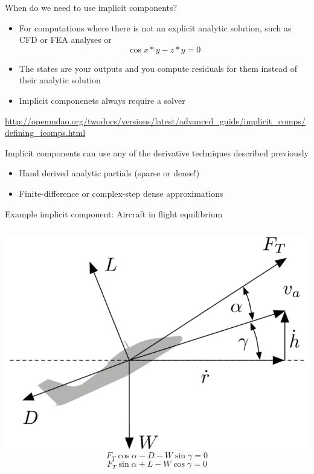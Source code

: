 \documentclass[aspectratio=169, usenames,dvipsnames, 14pt]{beamer}
\begin{document}
\begin{frame}{When do we need to use implicit components?}   

	\begin{itemize}
		\item For computations where there is not an explicit analytic solution, such as CFD or FEA analyses or $$ \cos{x*y} - z*y = 0 $$
		\item The states are your outputs and you compute residuals for them instead of their analytic solution
		\item Implicit componenets always require a solver
	\end{itemize}
	\url{http://openmdao.org/twodocs/versions/latest/advanced_guide/implicit_comps/defining_icomps.html}
	
\end{frame}  

\begin{frame}{Implicit components can use any of the derivative techniques described previously}

	\begin{itemize}
		\item Hand derived analytic partials (sparse or dense!)
		\item Finite-difference or complex-step dense approximations
	\end{itemize}

\end{frame}     

\begin{frame}{Example implicit component: Aircraft in flight equilibrium}

	\begin{columns}
			\includegraphics[scale=.46]{images/slide_49_derivatives.png}
				$$ F_T \cos{\alpha} - D - W \sin{\gamma} = 0 $$
				$$ F_T \sin{\alpha} + L - W \cos{\gamma} = 0 $$
	\end{columns}

\end{frame}
\end{document}
